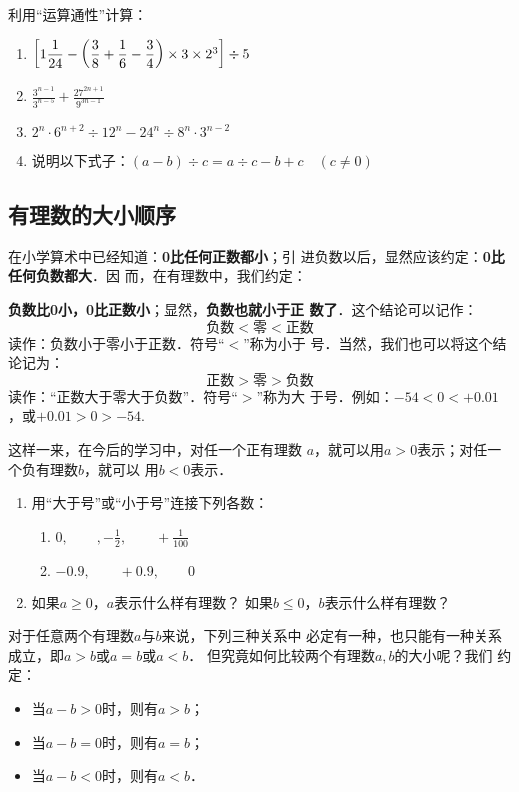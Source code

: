 \begin{ex}
    利用“运算通性”计算：
    \begin{enumerate}
        \item $\left[1\dfrac{1}{24}-\left(\dfrac{3}{8}+\dfrac{1}{6}-\dfrac{3}{4}\right)\times3\times2^3\right]\div 5$
        \item $\frac{3^{n-1}}{3^{n-5}}+\frac{27^{2n+1}}{9^{3n-1}}$
        \item $2^n\cdot 6^{n+2}\div 12^n-24^n\div 8^n\cdot 3^{n-2}$
        \item 说明以下式子：$(a-b)\div c=a\div c-b+c\quad (c\ne 0)$
    \end{enumerate}

\end{ex}

\subsection{有理数的大小顺序}
    在小学算术中已经知道：\textbf{0比任何正数都小}；引
进负数以后，显然应该约定：\textbf{0比任何负数都大}．因
而，在有理数中，我们约定：

\textbf{负数比0小，0比正数小}；显然，\textbf{负数也就小于正
数了}．这个结论可以记作：
\[\text{负数}<\text{零}<\text{正数}\]
读作：负数小于零小于正数．符号“$<$”称为小于
号．当然，我们也可以将这个结论记为：
\[\text{正数}>\text{零}>\text{负数}\]
读作：“正数大于零大于负数”．符号“$>$”称为大
于号．例如：$-54<0<+0.01$，或$+0.01>0> -54$.

这样一来，在今后的学习中，对任一个正有理数
$a$，就可以用$a>0$表示；对任一个负有理数$b$，就可以
用$b<0$表示．

\begin{ex}
\begin{enumerate}
    \item 用“大于号”或“小于号”连接下列各数：
\begin{enumerate}
    \item $0,\qquad ,-\frac{1}{2},\qquad +\frac{1}{100}$
    \item $-0.9,\qquad +0.9,\qquad 0$
\end{enumerate}
\item 如果$a\ge 0$，$a$表示什么样有理数？
如果$b\le 0$，$b$表示什么样有理数？
\end{enumerate}
 \end{ex}   

    对于任意两个有理数$a$与$b$来说，下列三种关系中
必定有一种，也只能有一种关系成立，即$a>b$或$a =b$或$a<b$．
    但究竟如何比较两个有理数$a,  b$的大小呢？我们
约定：
\begin{itemize}
    \item 当$a-b>0$时，则有$a > b$；
    \item     当$a-b=0$时，则有$a=b$；
    \item   当$a-b<0$时，则有$a < b$．
\end{itemize}

